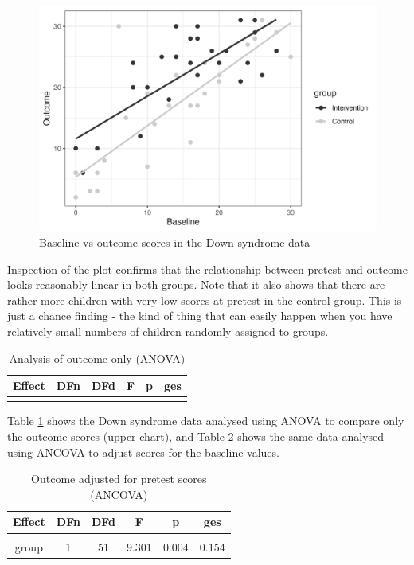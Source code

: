 \documentclass{krantz}
\begin{document}
\begin{center}
\begin{figure}
\includegraphics[width=0.7\linewidth]{images_bw/ds-prepost} \caption{Baseline vs outcome scores in the Down syndrome data}\label{fig:ds-prepost}
\end{figure}
\end{center}

Inspection of the plot confirms that the relationship between pretest and outcome looks reasonably linear in both groups. Note that it also shows that there are rather more children with very low scores at pretest in the control group. This is just a chance finding - the kind of thing that can easily happen when you have relatively small numbers of children randomly assigned to groups.

\begin{table}

\caption{\label{tab:ancova-compare}Analysis of outcome only (ANOVA)}
\centering
\begin{tabular}[t]{>{}cccccc}
\toprule
Effect & DFn & DFd & F & p & ges\\
\midrule
\textbf{\cellcolor{gray!6}{group}} & \cellcolor{gray!6}{1} & \cellcolor{gray!6}{52} & \cellcolor{gray!6}{6.773} & \cellcolor{gray!6}{0.012} & \cellcolor{gray!6}{0.115}\\
\bottomrule
\end{tabular}
\end{table}

Table \ref{tab:ancova-compare} shows the Down syndrome data analysed using ANOVA to compare only the outcome scores (upper chart), and Table \ref{tab:ancova} shows the same data analysed using ANCOVA to adjust scores for the baseline values.

\begin{table}

\caption{\label{tab:ancova}Outcome adjusted for pretest scores (ANCOVA)}
\centering
\begin{tabular}[t]{cccccc}
\toprule
Effect & DFn & DFd & F & p & ges\\
\midrule
\cellcolor{gray!6}{baseline} & \cellcolor{gray!6}{1} & \cellcolor{gray!6}{51} & \cellcolor{gray!6}{94.313} & \cellcolor{gray!6}{0.000} & \cellcolor{gray!6}{0.649}\\
group & 1 & 51 & 9.301 & 0.004 & 0.154\\
\bottomrule
\end{tabular}
\end{table}
\end{document}
